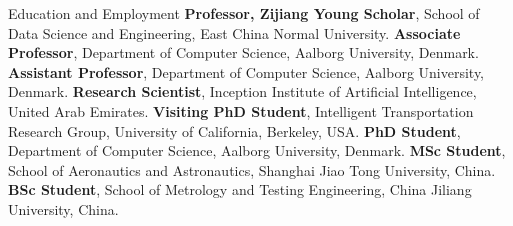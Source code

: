 \begin{rubric}{Education and Employment}
\entry*[2023 -- present]%
	\textbf{Professor, Zijiang Young Scholar}, School of Data Science and Engineering, East China Normal University.
\entry*[2022 -- 2023]%
	\textbf{Associate Professor}, Department of Computer Science, Aalborg University, Denmark.
\entry*[2020 -- 2022]%
	\textbf{Assistant Professor}, Department of Computer Science, Aalborg University, Denmark.
\entry*[2019 -- 2020]%
	\textbf{Research Scientist}, Inception Institute of Artificial Intelligence, United Arab Emirates.
\entry*[2017 -- 2018]%
	\textbf{Visiting PhD Student}, Intelligent Transportation Research Group, University of California, Berkeley, USA.
\entry*[2015 -- 2019]%
	\textbf{PhD Student}, Department of Computer Science, Aalborg University, Denmark.
\entry*[2011 -- 2014]%
        \textbf{MSc Student}, School of Aeronautics and Astronautics, Shanghai Jiao Tong University, China.
\entry*[2007 -- 2011]%
        \textbf{BSc Student}, School of Metrology and Testing Engineering, China Jiliang University, China.
\end{rubric}
